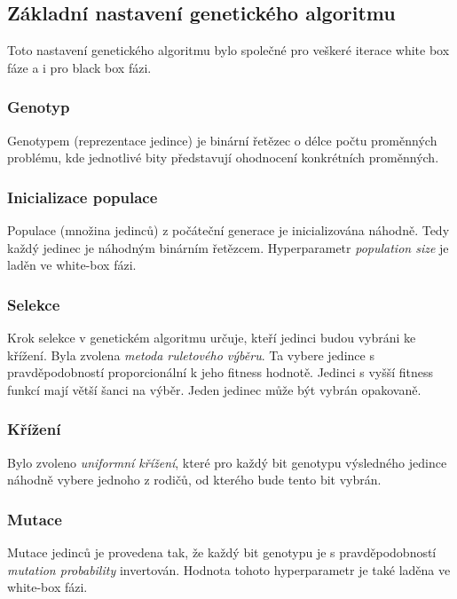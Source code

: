 \documentclass[12pt]{article}
\begin{document}
\subsection{Základní nastavení genetického algoritmu}
Toto nastavení genetického algoritmu bylo společné pro veškeré iterace white box fáze a i pro black box fázi.

\subsubsection{Genotyp}
Genotypem (reprezentace jedince) je binární řetězec o délce počtu proměnných problému, kde jednotlivé bity představují ohodnocení konkrétních proměnných.

\subsubsection{Inicializace populace}
Populace (množina jedinců) z počáteční generace je inicializována náhodně. Tedy každý jedinec je náhodným binárním řetězcem. Hyperparametr \textit{population size} je laděn ve white-box fázi.

\subsubsection{Selekce}
Krok selekce v genetickém algoritmu určuje, kteří jedinci budou vybráni ke křížení. Byla zvolena \textit{metoda ruletového výběru}. Ta vybere jedince s pravděpodobností proporcionální k jeho fitness hodnotě. Jedinci s vyšší fitness funkcí mají větší šanci na výběr. Jeden jedinec může být vybrán opakovaně.

\subsubsection{Křížení}
Bylo zvoleno \textit{uniformní křížení}, které pro každý bit genotypu výsledného jedince náhodně vybere jednoho z rodičů, od kterého bude tento bit vybrán. 

\subsubsection{Mutace}
Mutace jedinců je provedena tak, že každý bit genotypu je s pravděpodobností \textit{mutation probability} invertován. Hodnota tohoto hyperparametr je také laděna ve white-box fázi.

\end{document}

